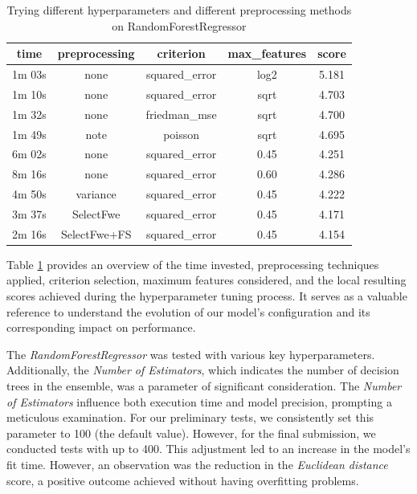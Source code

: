 \documentclass[conference]{IEEEtran}
\begin{document}
\begin{table}[htbp]
\centering
\begin{tabular}{|c|c|c|c|c|} \hline
time&  preprocessing&  criterion&  max\_features& score\\ \hline
1m 03s&  none&  squared\_error&  log2& 5.181\\ \hline
1m 10s&  none&  squared\_error&  sqrt& 4.703\\ \hline
1m 32s&  none&  friedman\_mse&  sqrt& 4.700\\ \hline
1m 49s&  note&  poisson&  sqrt& 4.695\\ \hline
6m 02s&  none&  squared\_error&  0.45& 4.251\\ \hline
8m 16s&  none&  squared\_error&  0.60& 4.286\\ \hline
4m 50s&  variance&  squared\_error&  0.45& 4.222\\ \hline
3m 37s&  SelectFwe&  squared\_error&  0.45& 4.171\\ \hline
2m 16s&  SelectFwe+FS&  squared\_error&  0.45& 4.154\\ \hline
\end{tabular}
\caption{Trying different hyperparameters and different preprocessing methods on RandomForestRegressor}
\label{tab:hyperparameters_table}
\end{table}

Table \ref{tab:hyperparameters_table} provides an overview of the time invested, 
preprocessing techniques applied, criterion selection, maximum features considered, 
and the local resulting scores achieved during the hyperparameter tuning process. 
It serves as a valuable reference to understand the evolution of our model's 
configuration and its corresponding impact on performance.

The \textit{RandomForestRegressor} was tested with various key hyperparameters. 
Additionally, the \textit{Number of Estimators}, which indicates the number
of decision trees in the ensemble, was a parameter of significant consideration.
The \textit{Number of Estimators} influence both execution time and model precision, 
prompting a meticulous examination. For our preliminary tests, we consistently set 
this parameter to 100 (the default value). 
However, for the final submission, we conducted tests with up to
400. This adjustment led to an increase in the model's fit time. 
However, an observation was the reduction in the \textit{Euclidean distance}
score, a positive outcome achieved without having overfitting problems.
\end{document}
